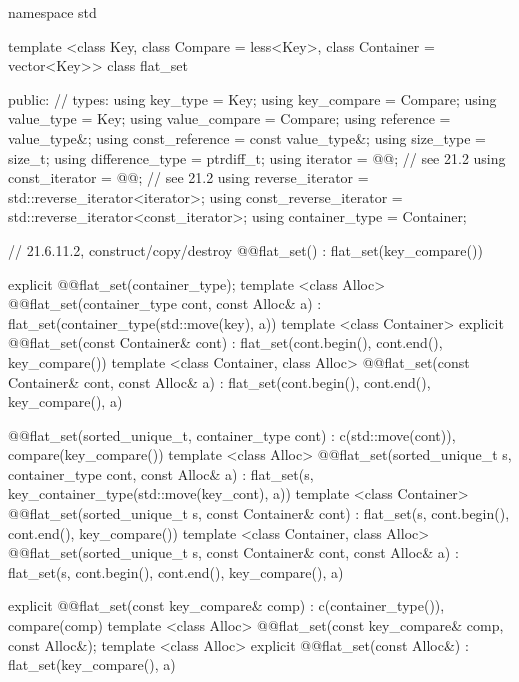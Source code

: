 \begin{codeblock}
namespace std {
  template <class Key, class Compare = less<Key>, class Container = vector<Key>>
  class flat_set {
  public:
    // types:
    using key_type                  = Key;
    using key_compare               = Compare;
    using value_type                = Key;
    using value_compare             = Compare;
    using reference                 = value_type&;
    using const_reference           = const value_type&;
    using size_type                 = size_t;
    using difference_type           = ptrdiff_t;
    using iterator                  = @@; // see 21.2
    using const_iterator            = @@; // see 21.2
    using reverse_iterator          = std::reverse_iterator<iterator>;
    using const_reverse_iterator    = std::reverse_iterator<const_iterator>;
    using container_type            = Container;

    // 21.6.11.2, construct/copy/destroy
    @@flat_set() : flat_set(key_compare()) { }

    explicit @@flat_set(container_type);
    template <class Alloc>
      @@flat_set(container_type cont, const Alloc& a)
        : flat_set(container_type(std::move(key), a)) { }
    template <class Container>
      explicit @@flat_set(const Container& cont)
        : flat_set(cont.begin(), cont.end(), key_compare()) { }
    template <class Container, class Alloc>
      @@flat_set(const Container& cont, const Alloc& a)
        : flat_set(cont.begin(), cont.end(), key_compare(), a) { }

    @@flat_set(sorted_unique_t, container_type cont)
      : c(std::move(cont)), compare(key_compare()) { }
    template <class Alloc>
      @@flat_set(sorted_unique_t s, container_type cont, const Alloc& a)
        : flat_set(s, key_container_type(std::move(key_cont), a)) { }
    template <class Container>
      @@flat_set(sorted_unique_t s, const Container& cont)
        : flat_set(s, cont.begin(), cont.end(), key_compare()) { }
    template <class Container, class Alloc>
      @@flat_set(sorted_unique_t s, const Container& cont, const Alloc& a)
        : flat_set(s, cont.begin(), cont.end(), key_compare(), a) { }

    explicit @@flat_set(const key_compare& comp)
      : c(container_type()), compare(comp) { }
    template <class Alloc>
      @@flat_set(const key_compare& comp, const Alloc&);
    template <class Alloc>
      explicit @@flat_set(const Alloc&) 
        : flat_set(key_compare(), a) { }

}}
\end{codeblock}
